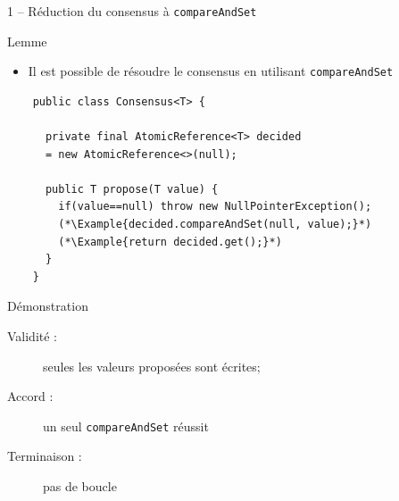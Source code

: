 
\begingroup

\begin{frame}[fragile]{1 -- Réduction du consensus à \lstinline{compareAndSet}}

  \begin{exampleblock}{Lemme}
    \begin{itemize}
    \item Il est possible de résoudre le consensus en utilisant \lstinline{compareAndSet}
    \end{itemize}
  \end{exampleblock}

  \begin{lstlisting}
    public class Consensus<T> {
      
      private final AtomicReference<T> decided
      = new AtomicReference<>(null);
      
      public T propose(T value) {
        if(value==null) throw new NullPointerException();  
        (*\Example{decided.compareAndSet(null, value);}*)
        (*\Example{return decided.get();}*)
      }
    }
    \end{lstlisting}

  \begin{block}{Démonstration}
    \begin{description}
    \item[Validité :] seules les valeurs proposées sont écrites;
    \item[Accord :] un seul \lstinline{compareAndSet} réussit
    \item[Terminaison :] pas de boucle
    \end{description}
  \end{block}

\end{frame}

\endgroup
\endinput
